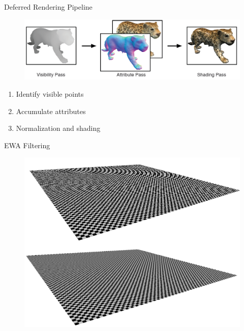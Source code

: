 \documentclass[16pt]{beamer}
\begin{document}
\begin{frame}{Deferred Rendering Pipeline}
\begin{figure}[hbtp]
\centering
\includegraphics[width=\textwidth]{img/Passes}
\end{figure}


\begin{enumerate}
\item Identify visible points
\item Accumulate attributes
\item Normalization and shading
\end{enumerate}

\end{frame}

\begin{frame}{EWA Filtering}
\begin{figure}[hbtp]
\centering
\includegraphics[width=\textwidth]{img/EWA_filter}
\end{figure}

\end{frame}
\end{document}
